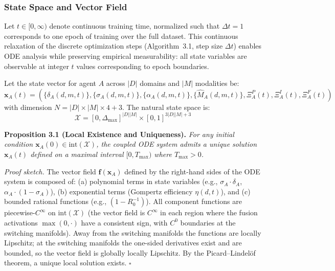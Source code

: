 \documentclass[10pt]{article}
\begin{document}
\subsubsection{State Space and Vector Field}\label{sec:state-space}

Let $t \in [0, \infty)$ denote continuous training time, normalized such that
$\Delta t = 1$ corresponds to one epoch of training over the full dataset.
This continuous relaxation of the discrete optimization steps (Algorithm~3.1,
step size $\Delta t$) enables ODE analysis while preserving empirical
measurability: all state variables are observable at integer $t$ values
corresponding to epoch boundaries.

Let the state vector for agent $A$ across $|D|$ domains and $|M|$
modalities be:
\begin{equation}\label{eq:state-vector}
\mathbf{x}_A(t) = \left(\{\delta_A(d,m,t)\}, \{\sigma_A(d,m,t)\}, \{\alpha_A(d,m,t)\}, \{\hat{M}_A(d,m,t)\}, \Xi_A^P(t), \Xi_A^I(t), \Xi_A^F(t)\right)
\end{equation}
with dimension $N = |D|\times|M|\times 4 + 3$. The natural state space is:
\begin{equation}\label{eq:state-space}
\mathcal{X} = [0, \Delta_{\max}]^{ |D||M| } \times [0,1]^{3|D||M| + 3}
\end{equation}

\textbf{Proposition 3.1 (Local Existence and Uniqueness).} %
\textit{For any initial condition $\mathbf{x}_A(0) \in \text{int}(\mathcal{X})$,
the coupled ODE system admits a unique solution $\mathbf{x}_A(t)$ defined
on a maximal interval $[0, T_{\max})$ where $T_{\max} > 0$.}

\textit{Proof sketch.} The vector field $\mathbf{f}(\mathbf{x}_A)$ defined
by the right-hand sides of the ODE system is composed of: (a) polynomial
terms in state variables (e.g., $\sigma_A \cdot \delta_A$, $\alpha_A \cdot (1-\sigma_A)$),
(b) exponential terms (Gompertz efficiency $\eta(d,t)$), and (c) bounded
rational functions (e.g., $(1 - R_0^{-1})$). All component functions are
piecewise-$C^\infty$ on $\text{int}(\mathcal{X})$ (the vector field is $C^\infty$ in each region where the fusion activations $\max(0,\cdot)$ have a consistent sign, with $C^0$ boundaries at the switching manifolds). Away from the switching manifolds the functions are locally Lipschitz; at the switching manifolds the one-sided derivatives exist and are bounded, so the vector field is globally locally Lipschitz. By the Picard--Lindel\"of theorem, a unique local solution exists. $\square$
\end{document}
